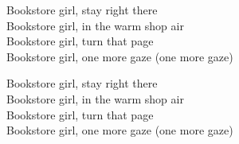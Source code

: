 \begin{lyrics}
Bookstore girl, stay right there\\
Bookstore girl, in the warm shop air\\
Bookstore girl, turn that page\\
Bookstore girl, one more gaze (one more gaze)

Bookstore girl, stay right there\\
Bookstore girl, in the warm shop air\\
Bookstore girl, turn that page\\
Bookstore girl, one more gaze (one more gaze)
\end{lyrics}
